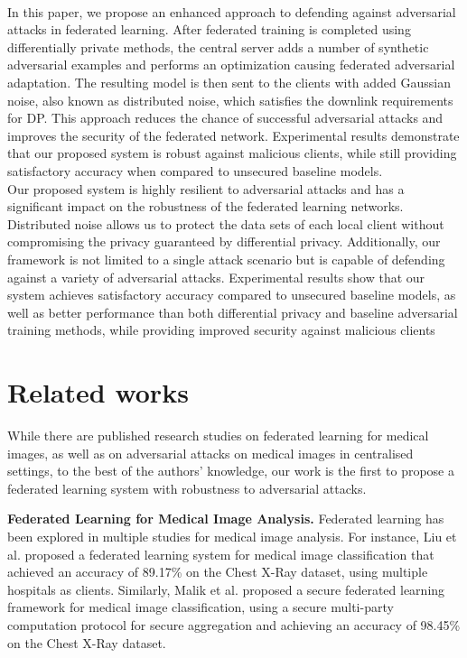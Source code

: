 \\In this paper, we propose an enhanced approach to defending against adversarial attacks in federated learning. After federated training is completed using differentially private methods, the central server adds a number of synthetic adversarial examples and performs an optimization causing federated adversarial adaptation. The resulting model is then sent to the clients with added Gaussian noise, also known as distributed noise, which satisfies the downlink requirements for DP. This approach  reduces the chance of successful adversarial attacks and improves the security of the federated network. Experimental results demonstrate that our proposed system is robust against malicious clients, while still providing satisfactory accuracy when compared to unsecured baseline models.
\\Our proposed system is highly resilient to adversarial attacks and has a significant impact on the robustness of the federated learning networks. Distributed noise allows us to protect the data sets of each local client without compromising the privacy guaranteed by differential privacy. Additionally, our framework is not limited to a single attack scenario but is capable of defending against a variety of adversarial attacks. Experimental results show that our system achieves satisfactory accuracy compared to unsecured baseline models, as well as better performance than both differential privacy and baseline adversarial training methods, while providing improved security against malicious clients 
\section{Related works}
While there are published research studies on federated learning for
medical images, as well as on adversarial attacks on medical images in centralised settings, to
the best of the authors’ knowledge, our work is the first to propose a federated learning system with robustness to adversarial attacks.

\textbf{Federated Learning for Medical Image Analysis.} Federated learning has been  explored in multiple studies for medical image analysis. For instance, Liu et al. proposed a federated learning system for medical image classification that achieved an accuracy of 89.17\% on the Chest X-Ray dataset, using multiple hospitals as clients\cite{liu2020experiments}. Similarly, Malik et al. proposed a secure federated learning framework for medical image classification, using a secure multi-party computation protocol for secure aggregation and achieving an accuracy of 98.45\% on the Chest X-Ray dataset\cite{malik2023dmfl_net}.





